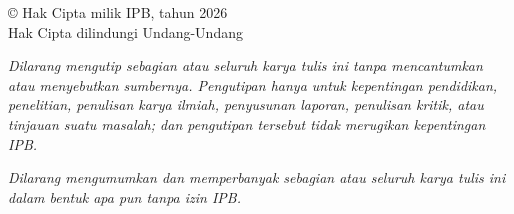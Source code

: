 
\clearpage
\thispagestyle{empty}

\vspace*{\fill}

\begin{center}
{\fontsize{14pt}{17pt}\selectfont
\copyright{} Hak Cipta milik IPB, tahun 2026\\
Hak Cipta dilindungi Undang-Undang
}
\end{center}

\vspace{\baselineskip}

\textit{Dilarang mengutip sebagian atau seluruh karya tulis ini tanpa
mencantumkan atau menyebutkan sumbernya. Pengutipan hanya untuk kepentingan
pendidikan, penelitian, penulisan karya ilmiah, penyusunan laporan, penulisan
kritik, atau tinjauan suatu masalah; dan pengutipan tersebut tidak merugikan
kepentingan IPB.}

\vspace{\baselineskip}

\textit{Dilarang mengumumkan dan memperbanyak sebagian atau seluruh karya tulis
ini dalam bentuk apa pun tanpa izin IPB.}
